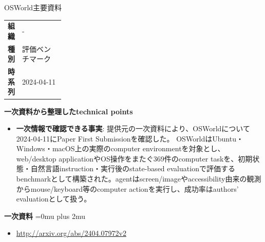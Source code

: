 \Needspace{0.38\textheight}
\begin{technicalnote}{OSWorld}{主要資料}
\begingroup
\begin{tabularx}{\linewidth}{@{}>{\bfseries}p{0.22\linewidth}X@{}}
組織 & - \\
種別 & 評価ベンチマーク \\
時系列 & 2024-04-11 \\
\end{tabularx}
\smallskip
\begin{minipage}{\linewidth}
{\bfseries 一次資料から整理したtechnical points}
\begin{itemize}[leftmargin=1.5em,itemsep=0.35em]
\item \textbf{一次情報で確認できる事実}: 提供元の一次資料により、OSWorldについて2024-04-11にPaper First Submissionを確認した。 OSWorldはUbuntu・Windows・macOS上の実際のcomputer environmentを対象とし、web/desktop applicationやOS操作をまたぐ369件のcomputer taskを、初期状態・自然言語instruction・実行後のstate-based evaluationで評価するbenchmarkとして構築された。agentはscreen/imageやaccessibility由来の観測からmouse/keyboard等のcomputer actionを実行し、成功率はauthors' evaluationとして扱う。
\end{itemize}
\begin{minipage}{\linewidth}
\begin{samepage}
{\bfseries 一次資料}
\begingroup\sloppy
\Urlmuskip=0mu plus 2mu\relax
\begin{itemize}[leftmargin=1.5em,itemsep=0.25em]
\item {\scriptsize\url{http://arxiv.org/abs/2404.07972v2}}
\end{itemize}
\endgroup
\end{samepage}
\end{minipage}
\end{minipage}
\endgroup
\end{technicalnote}
\medskip


